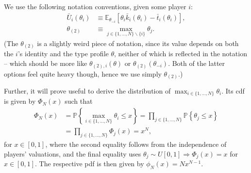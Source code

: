 \documentclass[a4paper]{article}
\begin{document}
We use the following notation conventions, given some player $i$:
\begin{align*}
	\bar{U}_i(\theta_i) &\equiv \mathbb{E}_{\theta_{-i}} \left[ \theta_i \bar{k}_i(\theta_i) - \bar{t}_i(\theta_i) \right],
	\\
	\theta_{(2)} &\equiv \max_{j \in \{1,...,N\} \backslash \{i\}} \theta_j .
\end{align*}
(The $\theta_{(2)}$ is a slightly weird piece of notation, since its value depends on both the $i$'s identity and the type profile $\theta$, neither of which is reflected in the notation -- which should be more like $\theta_{(2),i}(\theta)$ or $\theta_{(2)}(\theta_{-i})$. Both of the latter options feel quite heavy though, hence we use simply $\theta_{(2)}$.)

Further, it will prove useful to derive the distribution of $\max_{i \in \{1,...,N\}} \theta_i$. Its cdf is given by $\Phi_N(x)$ such that
\begin{equation} \label{eq:auc_Fmax}
\begin{aligned}
	\Phi_N(x) 
	&= \mathbb{P} \left\{ \max_{i \in \{1,...,N\}} \theta_i \leq x \right\}
	= \prod_{j \in \{1,...,N\}} \mathbb{P} \left\{ \theta_j \leq x \right\} 
	\\
	&= \prod_{j \in \{1,...,N\}} \Phi_j (x)
	= x^N,
\end{aligned}
\end{equation}
for $x \in [0,1]$, where the second equality follows from the independence of players' valuations, and the final equality uses $\theta_j \sim U[0,1] \Rightarrow \Phi_j(x) = x$ for $x \in [0,1]$. The respective pdf is then given by $\phi_{N}(x) = Nx^{N-1}$.
\end{document}
